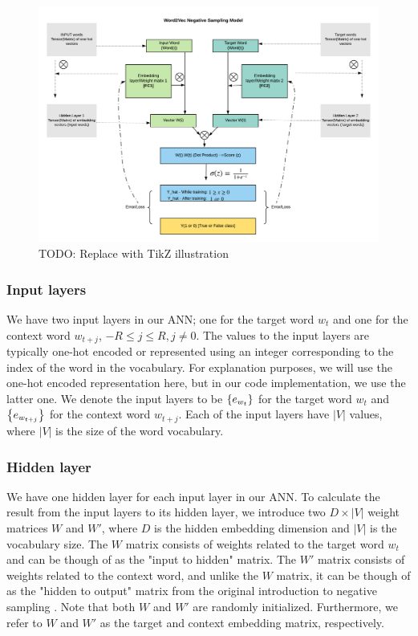 \begin{figure}[ht]
    \centering
    \includegraphics[width=15cm]{thesis/figures/word2vec-skip-gram-negative-sampling.png}
    \caption{TODO: Replace with TikZ illustration}
    \label{fig:word2vec-skip-gram-negative-sampling}
\end{figure}

\subsubsection{Input layers}
We have two input layers in our ANN; one for the target word $w_t$ and one for the context word $w_{t+j}$, $-R \leq j \leq R, j \neq 0$. The values to the input layers are typically one-hot encoded or represented using an integer corresponding to the index of the word in the vocabulary. For explanation purposes, we will use the one-hot encoded representation here, but in our code implementation, we use the latter one. We denote the input layers to be $\left\{e_{w_t}\right\}$ for the target word $w_t$ and $\left\{e_{w_{t+j}}\right\}$ for the context word $w_{t+j}$. Each of the input layers have $|V|$ values, where $|V|$ is the size of the word vocabulary.

\subsubsection{Hidden layer}
We have one hidden layer for each input layer in our ANN. To calculate the result from the input layers to its hidden layer, we introduce two $D \times |V|$ weight matrices $W$ and $W'$, where $D$ is the hidden embedding dimension and $|V|$ is the vocabulary size. The $W$ matrix consists of weights related to the target word $w_t$ and can be though of as the "input to hidden" matrix. The $W'$ matrix consists of weights related to the context word, and unlike the $W$ matrix, it can be though of as the "hidden to output" matrix from the original introduction to negative sampling \cite{mikolov2013b}. Note that both $W$ and $W'$ are randomly initialized. Furthermore, we refer to $W$ and $W'$ as the target and context embedding matrix, respectively.

